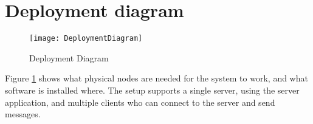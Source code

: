 \documentclass[Main]{subfiles}
\begin{document}
\section{Deployment diagram}
\begin{figure}[hbtp]
\centering
\texttt{[image: DeploymentDiagram]}
\caption{Deployment Diagram}
\label{fig:deploymentDiagram}
\end{figure}
Figure \ref{fig:deploymentDiagram} shows what physical nodes are needed for the system to work, and what software is installed where.
The setup supports a single server, using the server application, and multiple clients who can connect to the server and send messages.
\end{document}
